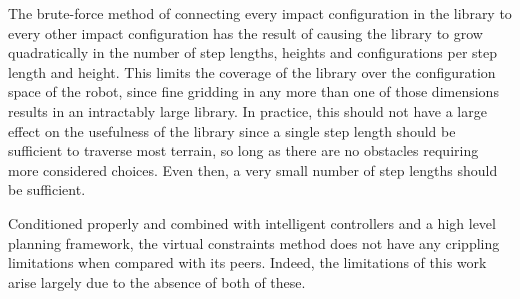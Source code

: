 The brute-force method of connecting every impact configuration in the library to every other impact configuration has the result of causing the library to grow quadratically in the number of step lengths, heights and configurations per step length and height. This limits the coverage of the library over the configuration space of the robot, since fine gridding in any more than one of those dimensions results in an intractably large library. In practice, this should not have a large effect on the usefulness of the library since a single step length should be sufficient to traverse most terrain, so long as there are no obstacles requiring more considered choices. Even then, a very small number of step lengths should be sufficient.

Conditioned properly and combined with intelligent controllers and a high level planning framework, the virtual constraints method does not have any crippling limitations when compared with its peers. Indeed, the limitations of this work arise largely due to the absence of both of these.